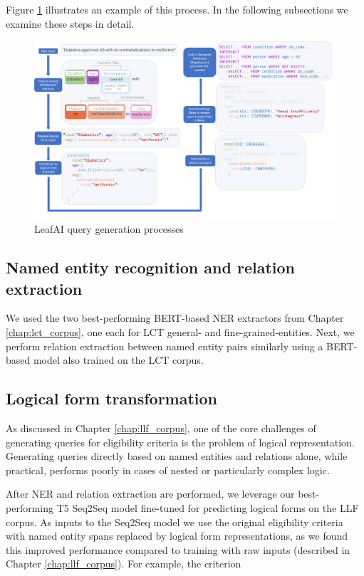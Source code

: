 \documentclass[../main.tex]{subfiles}
\begin{document}
\noindent Figure \ref{fig_leafai_querygen} illustrates an example of this process. In the following subsections we examine these steps in detail.

\begin{figure}[h]
  \includegraphics[scale=0.46]{Figures/7_query_generation/leafai_flow.pdf}  
\caption{LeafAI query generation processes}
\label{fig_leafai_querygen}
\end{figure}

\subsection{Named entity recognition and relation extraction}

\noindent We used the two best-performing BERT-based NER extractors from Chapter \ref{chap:lct_corpus}, one each for LCT general- and fine-grained-entities. Next, we perform relation extraction between named entity pairs similarly using a BERT-based model also trained on the LCT corpus.

\subsection{Logical form transformation}

As discussed in Chapter \ref{chap:llf_corpus}, one of the core challenges of generating queries for eligibility criteria is the problem of logical representation. Generating queries directly based on named entities and relations alone, while practical, performs poorly in cases of nested or particularly complex logic.

After NER and relation extraction are performed, we leverage our best-performing T5 Seq2Seq model fine-tuned for predicting logical forms on the LLF corpus. As inputs to the Seq2Seq model we use the original eligibility criteria with named entity spans replaced by logical form representations, as we found this improved performance compared to training with raw inputs (described in Chapter \ref{chap:llf_corpus}). For example, the criterion  
\end{document}
